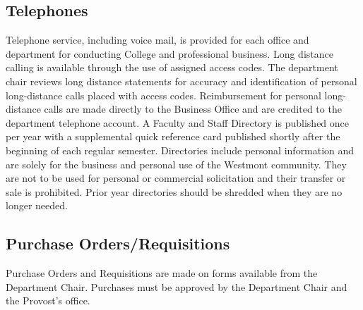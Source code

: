 	\subsection{Telephones}
		Telephone service, including voice mail, is provided for each office and department for conducting College and professional business.  Long distance calling is available through the use of assigned access codes.  The department chair reviews long distance statements for accuracy and identification of personal long-distance calls placed with access codes.  Reimbursement for personal long-distance calls are made directly to the Business Office and are credited to the department telephone account.  A Faculty and Staff Directory is published once per year with a supplemental quick reference card published shortly after the beginning of each regular semester.  Directories include personal information and are solely for the business and personal use of the Westmont community.  They are not to be used for personal or commercial solicitation and their transfer or sale is prohibited.  Prior year directories should be shredded when they are no longer needed.
	\subsection{Purchase Orders/Requisitions}
		Purchase Orders and Requisitions are made on forms available from the Department Chair.  Purchases must be approved by the Department Chair and the Provost's office.
